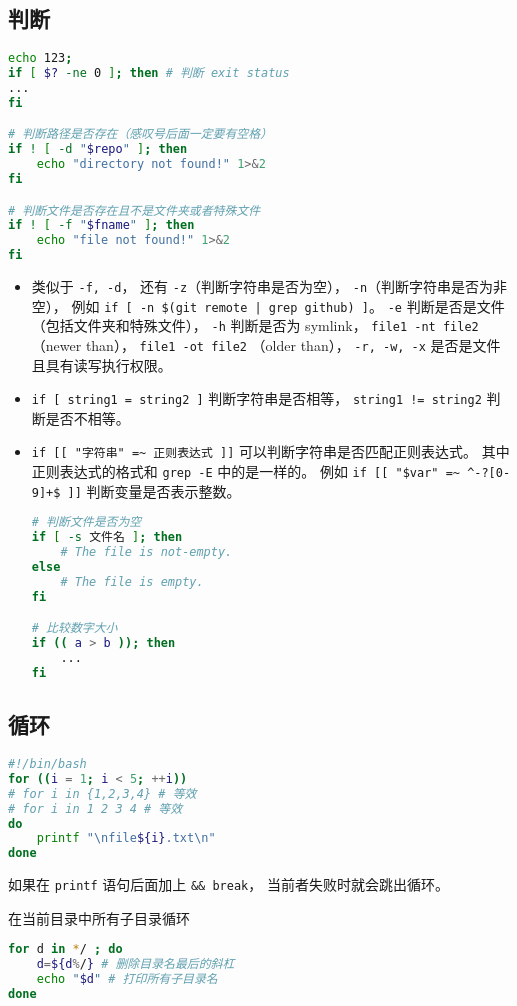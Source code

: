 \subsection{判断}
\begin{lstlisting}[language=bash]
echo 123;
if [ $? -ne 0 ]; then # 判断 exit status
...
fi

# 判断路径是否存在（感叹号后面一定要有空格）
if ! [ -d "$repo" ]; then
    echo "directory not found!" 1>&2
fi

# 判断文件是否存在且不是文件夹或者特殊文件
if ! [ -f "$fname" ]; then
    echo "file not found!" 1>&2
fi
\end{lstlisting}
\begin{itemize}
\item 类似于 \verb|-f, -d|， 还有 \verb|-z|（判断字符串是否为空）， \verb|-n|（判断字符串是否为非空）， 例如 \verb`if [ -n $(git remote | grep github) ]`。  \verb|-e| 判断是否是文件（包括文件夹和特殊文件）， \verb|-h| 判断是否为 symlink， \verb|file1 -nt file2| （newer than）， \verb|file1 -ot file2| （older than）， \verb|-r, -w, -x| 是否是文件且具有读写执行权限。
\item \verb|if [ string1 = string2 ]| 判断字符串是否相等， \verb|string1 != string2| 判断是否不相等。
\item \verb|if [[ "字符串" =~ 正则表达式 ]]| 可以判断字符串是否匹配正则表达式。 其中正则表达式的格式和 \verb|grep -E| 中的是一样的。 例如 \verb|if [[ "$var" =~ ^-?[0-9]+$ ]]| 判断变量是否表示整数。
\begin{lstlisting}[language=bash]
# 判断文件是否为空
if [ -s 文件名 ]; then
    # The file is not-empty.
else
    # The file is empty.
fi

# 比较数字大小
if (( a > b )); then
    ...
fi
\end{lstlisting}
\end{itemize}

\subsection{循环}
\begin{lstlisting}[language=bash]
#!/bin/bash
for ((i = 1; i < 5; ++i))
# for i in {1,2,3,4} # 等效
# for i in 1 2 3 4 # 等效
do
	printf "\nfile${i}.txt\n"
done
\end{lstlisting}
如果在 \verb|printf| 语句后面加上 \verb|&& break|， 当前者失败时就会跳出循环。

在当前目录中所有子目录循环
\begin{lstlisting}[language=bash]
for d in */ ; do
    d=${d%/} # 删除目录名最后的斜杠
    echo "$d" # 打印所有子目录名
done
\end{lstlisting}

